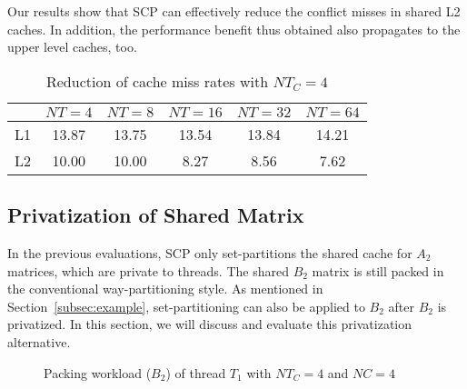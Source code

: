 Our results show that SCP can effectively
reduce the conflict misses in shared L2 caches.
In addition, the performance benefit thus obtained
also propagates to the upper level caches, too.

\begin{table}
  \centering
  \caption{Reduction of cache miss rates with $NT_C=4$}
  \label{tab:papi}
  \setlength{\tabcolsep}{3.5pt}
  \begin{tabular}{lccccc}
    \toprule
     & $NT=4$ & $NT=8$ & $NT=16$ & $NT=32$ & $NT=64$ \\
    \midrule
    L1     & 13.87 & 13.75 & 13.54 & 13.84 & 14.21 \\
    L2     & 10.00 & 10.00 & 8.27 & 8.56 & 7.62 \\
    \bottomrule
  \end{tabular}
\end{table}

\subsection{Privatization of Shared Matrix}\label{subsec:privb}
In the previous evaluations, SCP only set-partitions the shared cache
for $A_2$ matrices, which are private to threads.
The shared $B_2$ matrix is still packed
in the conventional way-partitioning style.
As mentioned in Section~\ref{subsec:example},
set-partitioning can also be applied to $B_2$ after $B_2$ is privatized.
In this section, we will discuss and evaluate this privatization alternative.

\begin{figure}
  \centering
  \caption{Packing workload ($B_2$) of thread $T_1$ with $NT_C=4$ and $NC=4$}
  \label{fig:packb}
\end{figure}

